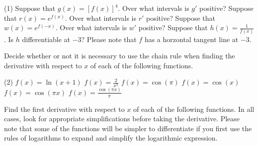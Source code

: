 \documentclass[12pt,]{book}
\theoremstyle{plain}
\theoremstyle{definition}
\numberwithin{equation}{section}
\newcommand{\fe}[2]{#1\mathopen{}\left(#2\right)\mathclose{}}
\newcommand{\fd}[1]{#1'}
\begin{document}
\par
\begin{exercisegroup}(1)
\exercise[6.]\hypertarget{exercise-487}{\null}Suppose that \(\fe{g}{x}=\left[\fe{f}{x}\right]^4\). Over what intervals is \(\fd{g}\) positive?%
\exercise[7.]\hypertarget{exercise-488}{\null}Suppose that \(\fe{r}{x}=e^{\fe{f}{x}}\). Over what intervals is \(\fd{r}\) positive?%
\exercise[8.]\hypertarget{exercise-489}{\null}Suppose that \(\fe{w}{x}=e^{\fe{f}{-x}}\). Over what intervals is \(\fd{w}\) positive?%
\exercise[9.]\hypertarget{exercise-490}{\null}Suppose that \(\fe{h}{x}=\frac{1}{\fe{f}{x}}\). Is \(h\) differentiable at \(-3\)? Please note that \(f\) has a horzontal tangent line at \(-3\).%
\end{exercisegroup}
\par\smallskip\noindent
Decide whether or not it is necessary to use the chain rule when finding the derivative with respect to \(x\) of each of the following functions.%
\par
\begin{exercisegroup}(2)
\exercise[10.]\hypertarget{exercise-491}{\null}\(\fe{f}{x}=\fe{\ln}{x+1}\)%
\exercise[11.]\hypertarget{exercise-492}{\null}\(\fe{f}{x}=\frac{2}{x^5}\)%
\exercise[12.]\hypertarget{exercise-493}{\null}\(\fe{f}{x}=\fe{\cos}{\pi}\)%
\exercise[13.]\hypertarget{exercise-494}{\null}\(\fe{f}{x}=\fe{\cos}{x}\)%
\exercise[14.]\hypertarget{exercise-495}{\null}\(\fe{f}{x}=\fe{\cos}{\pi x}\)%
\exercise[15.]\hypertarget{exercise-496}{\null}\(\fe{f}{x}=\frac{\fe{\cos}{\pi x}}{\pi}\)%
\end{exercisegroup}
\par\smallskip\noindent
Find the first derivative with respect to \(x\) of each of the following functions.  In all cases, look for appropriate simplifications before taking the derivative.  Please note that some of the functions will be simpler to differentiate if you first use the rules of logarithms to expand and simplify the logarithmic expression.%
\par
\end{document}
